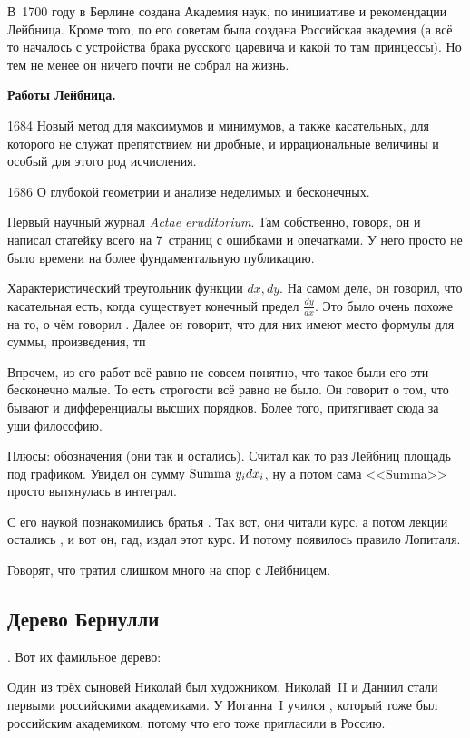 \documentclass[a4paper,oneside,fleqn,10pt]{article}
\newcommand{\cpic}[1]{$$\epsfbox{pictures.#1}$$}
\begin{document}
В~1700 году в Берлине создана Академия наук, по инициативе и рекомендации
Лейбница. Кроме того, по его советам была создана Российская академия
(а всё то началось с устройства брака русского царевича и какой то там принцессы).
Но тем не менее он ничего почти не собрал на жизнь.

\textbf{Работы Лейбница.}

1684 Новый метод для максимумов и минимумов, а также касательных, для которого не
служат препятствием ни дробные, и иррациональные величины и особый для этого род исчисления.

1686 О глубокой геометрии и анализе неделимых и бесконечных.

Первый научный журнал \emph{Actae eruditorium}. Там собственно, говоря,
он и написал статейку всего на 7~страниц с ошибками и опечатками.
У него просто не было времени на более фундаментальную публикацию.

Характеристический треугольник функции $dx,dy$. На самом деле, он говорил,
что касательная есть, когда существует конечный предел $\frac{dy}{dx}$.
Это было очень похоже на то, о чём говорил . Далее он говорит,
что для них имеют место формулы для суммы, произведения, тп

Впрочем, из его работ всё равно не совсем понятно, что такое были его эти бесконечно малые.
То есть строгости всё равно не было. Он говорит о том, что бывают и дифференциалы высших порядков.
Более того, притягивает сюда за уши философию.

Плюсы: обозначения (они так и остались). Считал как то раз Лейбниц площадь под графиком.
Увидел он сумму $\hbox{Summa }y_i dx_i$, ну а потом сама <<Summa>> просто вытянулась в интеграл.

С его наукой познакомились братья . Так вот, они читали курс,
а потом лекции остались , и вот он, гад, издал этот курс.
И потому появилось правило Лопиталя.

Говорят, что  тратил слишком много на спор с Лейбницем.

\subsection{Дерево Бернулли}

. Вот их фамильное дерево:


Один из трёх сыновей Николай был художником.
Николай~II и Даниил стали первыми российскими академиками.
У Иоганна~I учился , который тоже был российским академиком, потому что его
тоже пригласили  в Россию.
\end{document}
